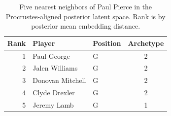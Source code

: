 \begin{table}[htbp]
  \centering\small
  \begin{tabular}{rllc}
    \toprule
    Rank & Player & Position & Archetype \\
    \midrule
    1 & Paul George & G & 2 \\
    2 & Jalen Williams & G & 2 \\
    3 & Donovan Mitchell & G & 2 \\
    4 & Clyde Drexler & G & 2 \\
    5 & Jeremy Lamb & G & 1 \\
    \bottomrule
  \end{tabular}
  \caption{Five nearest neighbors of Paul Pierce in the Procrustes-aligned posterior latent space. Rank is by posterior mean embedding distance.}
  \label{tab:Paul_Pierce_neighbors}
\end{table}

